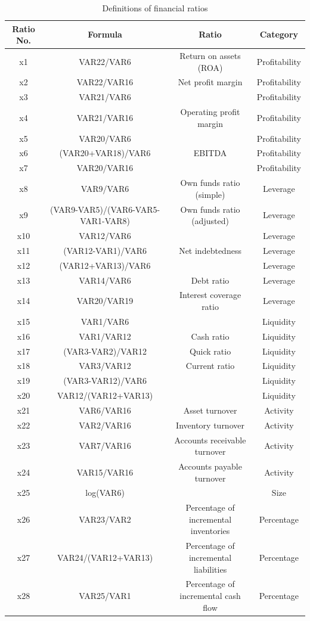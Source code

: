 \documentclass{article}
\begin{document}
\begin{table}
\begin{center}
\caption{Definitions of financial ratios}
\scriptsize
\begin{tabular}{cccc} 
\hline\hline
Ratio No. & Formula & Ratio & Category\\ 
\hline
x1 & VAR22/VAR6 & Return on assets (ROA) & Profitability\\
x2 & VAR22/VAR16 & Net profit margin & Profitability\\
x3 & VAR21/VAR6 & & Profitability\\
x4 & VAR21/VAR16 & Operating profit margin & Profitability\\
x5 & VAR20/VAR6 & & Profitability\\
x6 & (VAR20+VAR18)/VAR6 & EBITDA & Profitability\\ 
x7 & VAR20/VAR16 & & Profitability\\
x8 & VAR9/VAR6 & Own funds ratio (simple) & Leverage\\
x9 & (VAR9-VAR5)/(VAR6-VAR5-VAR1-VAR8) & Own funds ratio (adjusted) & Leverage\\
x10 & VAR12/VAR6 & & Leverage\\
x11 & (VAR12-VAR1)/VAR6 & Net indebtedness & Leverage\\
x12 & (VAR12+VAR13)/VAR6 & & Leverage\\
x13 & VAR14/VAR6 & Debt ratio & Leverage\\
x14 & VAR20/VAR19 & Interest coverage ratio & Leverage\\  
x15 & VAR1/VAR6 & & Liquidity\\
x16 & VAR1/VAR12 & Cash ratio & Liquidity\\
x17 & (VAR3-VAR2)/VAR12 & Quick ratio & Liquidity\\
x18 & VAR3/VAR12 & Current ratio & Liquidity\\ 
x19 & (VAR3-VAR12)/VAR6 & & Liquidity\\
x20 & VAR12/(VAR12+VAR13) & & Liquidity\\
x21 & VAR6/VAR16 & Asset turnover & Activity\\
x22 & VAR2/VAR16 & Inventory turnover & Activity\\
x23 & VAR7/VAR16 & Accounts receivable turnover & Activity\\
x24 & VAR15/VAR16 & Accounts payable turnover & Activity\\
x25 & log(VAR6) & & Size\\
x26 & VAR23/VAR2 & Percentage of incremental inventories & Percentage\\
x27 & VAR24/(VAR12+VAR13) & Percentage of incremental liabilities & Percentage\\
x28 & VAR25/VAR1 & Percentage of incremental cash flow & Percentage\\ 
\hline\hline
\end{tabular}
\end{center}
\end{table}
 
\end{document}
